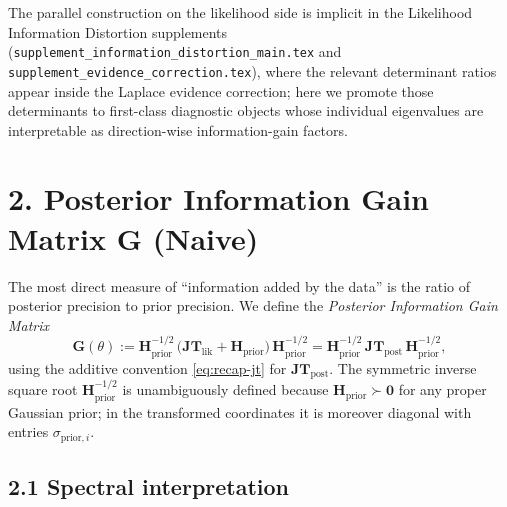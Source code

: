 \documentclass[11pt]{article}
\begin{document}
The parallel construction on the likelihood side is implicit in the Likelihood Information Distortion supplements (\texttt{supplement\_information\_distortion\_main.tex} and \texttt{supplement\_evidence\_correction.tex}), where the relevant determinant ratios appear inside the Laplace evidence correction; here we promote those determinants to first-class diagnostic objects whose individual eigenvalues are interpretable as direction-wise information-gain factors.

\section*{2. Posterior Information Gain Matrix $\mathbf G$ (Naive)}

The most direct measure of ``information added by the data'' is the ratio of posterior precision to prior precision. We define the \emph{Posterior Information Gain Matrix}
\begin{equation}
\mathbf G(\theta)
:=
\mathbf H_{\mathrm{prior}}^{-1/2}\,
\bigl(\mathbf{JT}_{\mathrm{lik}} + \mathbf H_{\mathrm{prior}}\bigr)\,
\mathbf H_{\mathrm{prior}}^{-1/2}
=
\mathbf H_{\mathrm{prior}}^{-1/2}\,
\mathbf{JT}_{\mathrm{post}}\,
\mathbf H_{\mathrm{prior}}^{-1/2},
\label{eq:G-def}
\end{equation}
using the additive convention \eqref{eq:recap-jt} for $\mathbf{JT}_{\mathrm{post}}$. The symmetric inverse square root $\mathbf H_{\mathrm{prior}}^{-1/2}$ is unambiguously defined because $\mathbf H_{\mathrm{prior}} \succ \mathbf 0$ for any proper Gaussian prior; in the transformed coordinates it is moreover diagonal with entries $\sigma_{\mathrm{prior},i}$.

\subsection*{2.1 Spectral interpretation}
\end{document}
